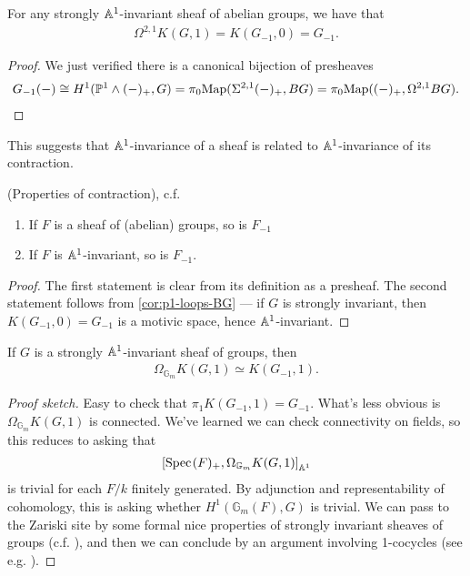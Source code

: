 \documentclass[11pt,openany]{book}
\let\smashprod\wedge
\begin{document}
\begin{corollary}\label{cor:p1-loops-BG} 
For any strongly $\mathbb{A}^1$-invariant sheaf of abelian groups, we have that 
\begin{align*}
    \Omega^{2,1} K(G,1) = K(G_{-1},0) = G_{-1}.
\end{align*}
\end{corollary}
\begin{proof} We just verified there is a canonical bijection of presheaves
\begin{align*}
    G_{-1}(-) \cong H^1(\P^1 \smashprod (-)_+, G) = \pi_0 \Map( \Sigma^{2,1} (-)_+, BG) = \pi_0 \Map ( (-)_+, \Omega^{2,1} BG).
\end{align*}
\end{proof}

This suggests that $\mathbb{A}^1$-invariance of a sheaf is related to $\mathbb{A}^1$-invariance of its contraction.


\begin{proposition} (Properties of contraction), c.f. \cite[\S4.1]{bachmannstrongly}
\begin{enumerate}
    \item If $F$ is a sheaf of (abelian) groups, so is $F_{-1}$
    \item If $F$ is $\mathbb{A}^1$-invariant, so is $F_{-1}$.
\end{enumerate}
\end{proposition}
\begin{proof} The first statement is clear from its definition as a presheaf. The second statement follows from \autoref{cor:p1-loops-BG} --- if $G$ is strongly invariant, then $K(G_{-1},0) = G_{-1}$ is a motivic space, hence $\mathbb{A}^1$-invariant.
\end{proof}


\begin{lemma}\label{lem:loops-KG1} 
If $G$ is a strongly $\mathbb{A}^1$-invariant sheaf of groups, then
\begin{align*}
    \Omega_{\mathbb{G}_m} K(G,1) \simeq K(G_{-1},1).
\end{align*}
\end{lemma}
\begin{proof}[Proof sketch] Easy to check that $\pi_1 K(G_{-1},1) = G_{-1}$. What's less obvious is $\Omega_{\mathbb{G}_m} K(G,1)$ is connected. We've learned we can check connectivity on fields, so this reduces to asking that
\begin{align*}
    \left[ \text{Spec}\hspace{0.1em}(F)_+, \Omega_{\mathbb{G}_m} K(G,1) \right]_{\mathbb{A}^1}
\end{align*}
is trivial for each $F/k$ finitely generated. By adjunction and representability of cohomology, this is asking whether $H^1(\mathbb{G}_m(F), G)$ is trivial. We can pass to the Zariski site by some formal nice properties of strongly invariant sheaves of groups (c.f. \cite[2.24]{Morel}), and then we can conclude by an argument involving 1-cocycles (see e.g. \cite[4.2]{bachmannstrongly}).
\end{proof}
\end{document}
